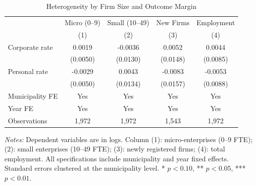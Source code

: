 \begin{table}[t]
\centering
\caption{Heterogeneity by Firm Size and Outcome Margin}
\label{tab:hetero}
\begin{tabular}{lcccc}
\hline\hline
 & Micro (0--9) & Small (10--49) & New Firms & Employment \\
 & (1) & (2) & (3) & (4) \\
\hline
Corporate rate & 0.0019 & -0.0036 & 0.0052 & 0.0044 \\
 & (0.0050) & (0.0130) & (0.0148) & (0.0085) \\
Personal rate & -0.0029 & 0.0043 & -0.0083 & -0.0053 \\
 & (0.0050) & (0.0134) & (0.0157) & (0.0088) \\
\hline
Municipality FE & Yes & Yes & Yes & Yes \\
Year FE & Yes & Yes & Yes & Yes \\
Observations & 1,972 & 1,972 & 1,543 & 1,972 \\
\hline\hline
\end{tabular}
\begin{tablenotes}
\item \textit{Notes:} Dependent variables are in logs. 
Column (1): micro-enterprises (0--9 FTE); (2): small enterprises (10--49 FTE); 
(3): newly registered firms; (4): total employment. 
All specifications include municipality and year fixed effects. 
Standard errors clustered at the municipality level. 
* $p<0.10$, ** $p<0.05$, *** $p<0.01$.
\end{tablenotes}
\end{table}
